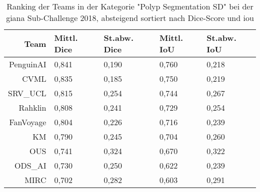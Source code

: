 \begin{table}
	\centering
	\setlength{\extrarowheight}{0pt}
	\addtolength{\extrarowheight}{\aboverulesep}
	\addtolength{\extrarowheight}{\belowrulesep}
	\setlength{\aboverulesep}{0pt}
	\setlength{\belowrulesep}{0pt}
	\caption[Ranking der Teams in der Kategorie "Polyp Segmentation SD" bei der \gls{giana} Sub-Challenge 2018]{Ranking der Teams in der Kategorie "Polyp Segmentation SD" bei der \gls{giana} Sub-Challenge 2018, absteigend sortiert nach Dice-Score und \gls{iou}}
	\label{tab:gianapolypsegranking}
	\begin{tabular}{rllll} 
		\toprule
		Team & Mittl. Dice & St.abw. Dice & Mittl. IoU & St.abw. IoU \\ 
		\midrule
		PenguinAI & {\cellcolor[rgb]{0.388,0.745,0.482}}0,841 & {\cellcolor[rgb]{0.408,0.749,0.486}}0,190 & {\cellcolor[rgb]{0.388,0.745,0.482}}0,760 & {\cellcolor[rgb]{0.388,0.745,0.482}}0,218 \\
		CVML & {\cellcolor[rgb]{0.4,0.749,0.486}}0,835 & {\cellcolor[rgb]{0.388,0.745,0.482}}0,185 & {\cellcolor[rgb]{0.404,0.753,0.486}}0,750 & {\cellcolor[rgb]{0.392,0.745,0.482}}0,219 \\
		SRV\_UCL & {\cellcolor[rgb]{0.427,0.761,0.494}}0,815 & {\cellcolor[rgb]{0.69,0.839,0.545}}0,254 & {\cellcolor[rgb]{0.412,0.753,0.49}}0,744 & {\cellcolor[rgb]{0.675,0.835,0.541}}0,267 \\
		Rahklin & {\cellcolor[rgb]{0.439,0.761,0.494}}0,808 & {\cellcolor[rgb]{0.631,0.82,0.533}}0,241 & {\cellcolor[rgb]{0.431,0.761,0.494}}0,729 & {\cellcolor[rgb]{0.6,0.808,0.525}}0,254 \\
		FanVoyage & {\cellcolor[rgb]{0.443,0.765,0.494}}0,804 & {\cellcolor[rgb]{0.569,0.8,0.518}}0,226 & {\cellcolor[rgb]{0.451,0.765,0.498}}0,716 & {\cellcolor[rgb]{0.51,0.78,0.506}}0,239 \\
		KM & {\cellcolor[rgb]{0.463,0.769,0.498}}0,790 & {\cellcolor[rgb]{0.651,0.827,0.537}}0,245 & {\cellcolor[rgb]{0.467,0.773,0.502}}0,704 & {\cellcolor[rgb]{0.635,0.82,0.533}}0,260 \\
		OUS & {\cellcolor[rgb]{0.533,0.792,0.514}}0,741 & {\cellcolor[rgb]{1,0.937,0.612}}0,324 & {\cellcolor[rgb]{0.514,0.784,0.51}}0,670 & {\cellcolor[rgb]{1,0.937,0.612}}0,322 \\
		ODS\_AI & {\cellcolor[rgb]{0.553,0.796,0.518}}0,730 & {\cellcolor[rgb]{0.671,0.831,0.541}}0,250 & {\cellcolor[rgb]{0.576,0.808,0.525}}0,622 & {\cellcolor[rgb]{0.51,0.78,0.506}}0,239 \\
		MIRC & {\cellcolor[rgb]{0.592,0.812,0.525}}0,702 & {\cellcolor[rgb]{0.812,0.878,0.573}}0,282 & {\cellcolor[rgb]{0.604,0.816,0.529}}0,603 & {\cellcolor[rgb]{0.816,0.878,0.573}}0,291 \\

\end{tabular}
\end{table}
